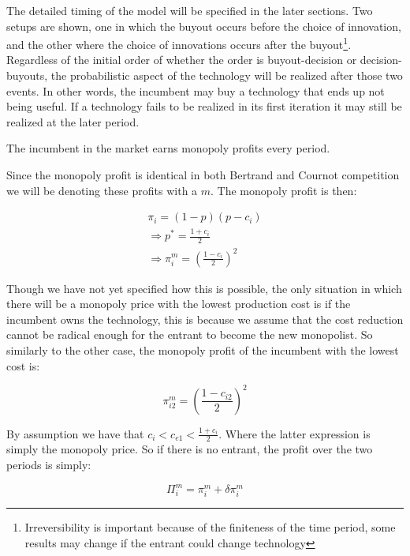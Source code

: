 \documentclass[11pt]{article}
\begin{document}


The detailed timing of the model will be specified in the later sections. Two setups are shown, one in which the buyout occurs before the choice of innovation, and the other where the choice of innovations occurs after the buyout\footnote{Irreversibility is important because of the finiteness of the time period, some results may change if the entrant could change technology }. Regardless of the initial order of whether the order is buyout-decision or decision-buyouts, the probabilistic aspect of the technology will be realized after those two events. In other words, the incumbent may buy a technology that ends up not being useful. If a technology fails to be realized in its first iteration it may still be realized at the later period. 




The incumbent in the market earns monopoly profits every period. 

Since the monopoly profit is identical in both Bertrand and Cournot competition we will be denoting these profits with a $m$. The monopoly profit is then:

\begin{align*}
\pi_i = (1-p)(p-c_i) \\
\Rightarrow p^* = \frac{1+c_i}{2} \\
\Rightarrow
\pi_i^m = \left(\frac{1-c_i}{2}\right)^2
\end{align*}

Though we have not yet specified how this is possible, the only situation in which there will be a monopoly price with the lowest production cost is if the incumbent owns the technology, this is because we assume that the cost reduction cannot be radical enough for the entrant to become the new monopolist. So similarly to the other case, the monopoly profit of the incumbent with the lowest cost is: 

\begin{equation*}
\pi_{i2}^m = \left(\frac{1-c_{i2}}{2}\right)^2
\end{equation*}

By assumption we have that $c_i<c_{e1}< \frac{1+c_i}{2}$. Where the latter expression is simply the monopoly price. So if there is no entrant, the profit over the two periods is simply: 

\begin{equation*}
\Pi_i^m = \pi_i^m + \delta \pi_i^m
\end{equation*}
\end{document}
